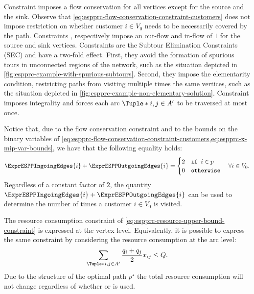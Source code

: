 Constraint  imposes a flow conservation for all vertices except for the source and the sink.
Observe that \cref{eq:espprc-flow-conservation-constraint-customers} does not impose
restriction on whether customer $i \in V_0$ needs to be necessarily covered by the path.
Constraints , 
respectively impose an out-flow and in-flow of $1$ for the source and sink vertices.
Constraints  are the Subtour Elimination Constraints (SEC) and
have a two-fold effect.
First, they avoid the formation of spurious tours in unconnected regions of the network, such
as the situation depicted in \cref{fig:espprc-example-with-spurious-subtours}.
Second, they impose the elementarity condition, restricting paths from visiting multiple times
the same vertices, such as the situation depicted in \cref{fig:espprc-example-non-elementary-solution}.
Constraint  imposes integrality
and forces each arc $\Tuple*{i, j} \in A^\prime$ to be traversed at most once.

Notice that, due to the flow conservation constraint and to the bounds on the binary variables of
\cref{eq:espprc-flow-conservation-constraint-customers,eq:espprc-x-mip-var-bounds},
we have that the following equality holds:
\begin{equation}
	\ExprESPPIngoingEdges{i} + \ExprESPPOutgoingEdges{i} = \begin{cases}
		2 & \texttt{if } i \in p \\
		0 & \texttt{otherwise}
	\end{cases}
	\quad \forall i \in V_0.
\end{equation}
Regardless of a constant factor of $2$,
the quantity $\ExprESPPIngoingEdges{i} + \ExprESPPOutgoingEdges{i}$
can be used to determine the number of times a  customer $i \in V_0$ is visited.

The resource consumption constraint of \cref{eq:espprc-resource-upper-bound-constraint} is
expressed at the vertex level.
Equivalently, it is possible to express the same constraint by considering the resource consumption
at the arc level:
\begin{equation}
	\label{eq:espprc-resource-upper-bound-constraint-arc-level}
	\sum_{\Tuple*{i, j} \in A^\prime} \frac{q_i + q_j}{2} x_{ij} \le Q.
\end{equation}
Due to the structure of the optimal path $p^\star$ the total resource consumption
will not change regardless of whether
or 
is used.

